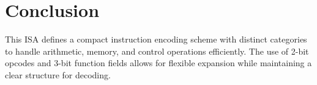 \documentclass{report}
\begin{document}
\section*{Conclusion}
This ISA defines a compact instruction encoding scheme with distinct categories to handle arithmetic, memory, and control operations efficiently. The use of 2-bit opcodes and 3-bit function fields allows for flexible expansion while maintaining a clear structure for decoding.
\end{document}
